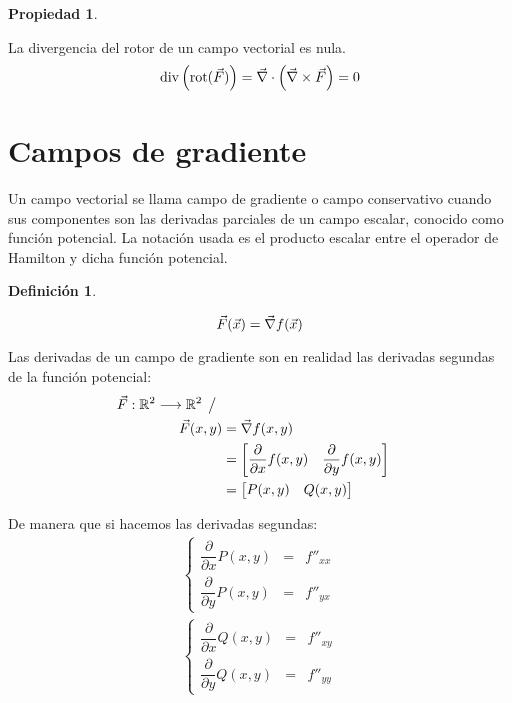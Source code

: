 \documentclass[a5paper,12pt,twoside]{book}
\newtheorem{defn}{{Definición}}[chapter]
\newtheorem{prop}{{Propiedad}}[chapter]
\begin{document}
\begin{mdframed}[style=MyFrame1]
    \begin{prop}
    \end{prop}
    La divergencia del rotor de un campo vectorial es nula.
    \begin{equation*}
        \operatorname{div} \left( \operatorname{rot}(\Vec{F}) \right) = \Vec{\nabla} \cdot \left( \Vec{\nabla} \times \Vec{F} \right) = 0
    \end{equation*}
\end{mdframed}


\section{Campos de gradiente}

Un campo vectorial se llama campo de gradiente o campo conservativo cuando sus componentes son las derivadas parciales de un campo escalar, conocido como función potencial. La notación usada es el producto escalar entre el operador de Hamilton y dicha función potencial.

\begin{mdframed}[style=MyFrame1]
    \begin{defn}
    \end{defn}
    \begin{equation*}
        \Vec{F}(\Vec{x}) = \Vec{\nabla} f(\Vec{x})
    \end{equation*}
\end{mdframed}

Las derivadas de un campo de gradiente son en realidad las derivadas segundas de la función potencial:
\begin{align*}
    \Vec{F}: \mathbb{R}^2 \longrightarrow \mathbb{R}^2 \hspace{1ex} \big/ \hspace{1ex}
    \\
    \Vec{F}(x,y) &= \Vec{\nabla} f(x,y)
    \\
    &= \begin{bmatrix}
        \dfrac{\partial}{\partial x} f(x,y) &     \dfrac{\partial}{\partial y} f(x,y)
    \end{bmatrix}
    \\
    &= \begin{bmatrix} P(x,y) & Q(x,y) \end{bmatrix}
\end{align*}

De manera que si hacemos las derivadas segundas:
\begin{gather*}
    \left\{
    \begin{aligned}
        \dfrac{\partial}{\partial x} P(x,y) &=& f''_{xx}
        \\[1ex]
        \dfrac{\partial}{\partial y} P(x,y) &=& f''_{yx}
    \end{aligned}
    \right.
    \\[1em]
    \left\{
    \begin{aligned}
        \dfrac{\partial}{\partial x} Q(x,y) &=& f''_{xy}
        \\[1ex]
        \dfrac{\partial}{\partial y} Q(x,y) &=& f''_{yy}
    \end{aligned}
    \right.
\end{gather*}
\end{document}

